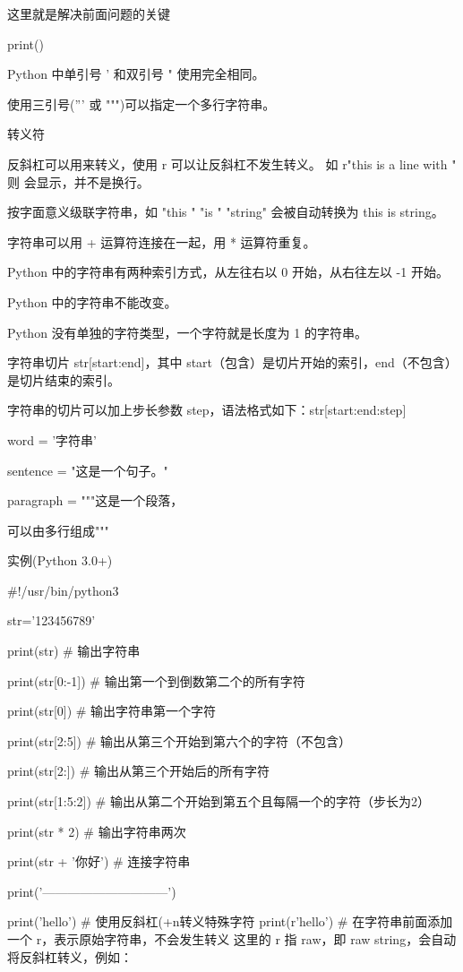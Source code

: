 这里就是解决前面问题的关键

print()

Python 中单引号 ' 和双引号 " 使用完全相同。

使用三引号(''' 或 """)可以指定一个多行字符串。

转义符 \。

反斜杠可以用来转义，使用 r 可以让反斜杠不发生转义。 如 r"this is a line with \n" 则 \n 会显示，并不是换行。

按字面意义级联字符串，如 "this " "is " "string" 会被自动转换为 this is string。

字符串可以用 + 运算符连接在一起，用 * 运算符重复。

Python 中的字符串有两种索引方式，从左往右以 0 开始，从右往左以 -1 开始。

Python 中的字符串不能改变。

Python 没有单独的字符类型，一个字符就是长度为 1 的字符串。

字符串切片 str[start:end]，其中 start（包含）是切片开始的索引，end（不包含）是切片结束的索引。

字符串的切片可以加上步长参数 step，语法格式如下：str[start:end:step]

word = '字符串'

sentence = "这是一个句子。"

paragraph = """这是一个段落，

可以由多行组成"""

实例(Python 3.0+)

#!/usr/bin/python3
 
str='123456789'
 
print(str)                 # 输出字符串

print(str[0:-1])           # 输出第一个到倒数第二个的所有字符

print(str[0])              # 输出字符串第一个字符

print(str[2:5])            # 输出从第三个开始到第六个的字符（不包含）

print(str[2:])             # 输出从第三个开始后的所有字符

print(str[1:5:2])          # 输出从第二个开始到第五个且每隔一个的字符（步长为2）

print(str * 2)             # 输出字符串两次

print(str + '你好')         # 连接字符串
 
print('------------------------------')
 
print('hello\nrunoob')      # 使用反斜杠(\)+n转义特殊字符
print(r'hello\nrunoob')     # 在字符串前面添加一个 r，表示原始字符串，不会发生转义
这里的 r 指 raw，即 raw string，会自动将反斜杠转义，例如：


